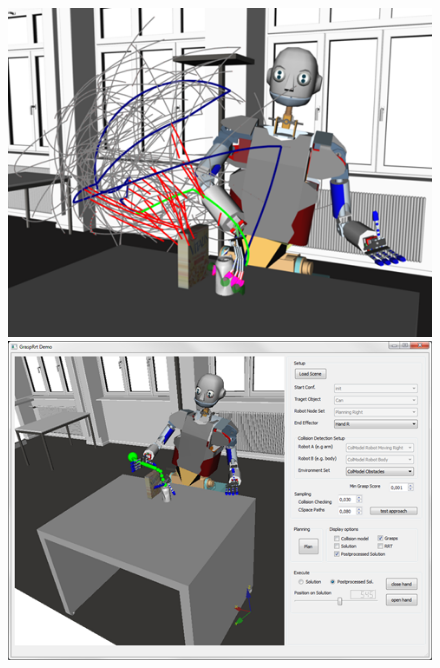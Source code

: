 \documentclass{book}
\begin{document}
 \begin{figure}[H]
 	\centering
 	\begin{minipage} {.45\linewidth}
 	  \includegraphics[width=\linewidth]{GraspRRT1}
 	\end{minipage}
 	\begin{minipage} {.45\linewidth}
 	  \includegraphics[width=\linewidth]{GraspRRT2}
 	\end{minipage}
 \end{figure}
\end{document}

